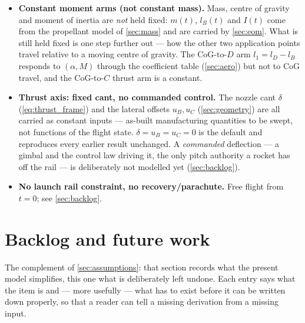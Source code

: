\documentclass[10pt]{extarticle}
\numberwithin{equation}{subsection}
\begin{document}
\begin{itemize}
    rotating $\hat{z}_g$; the two corrections stay deliberately independent
    (\autoref{sec:noninertial}, closing caveat).
    \item \textbf{Constant moment arms (not constant mass).} Mass, centre of gravity and moment of
    inertia are \emph{not} held fixed: $m(t)$, $l_B(t)$ and $I(t)$ come from the propellant model
    of \autoref{sec:mass} and are carried by \autoref{sec:eom}. What is still held fixed is one
    step further out --- how the other two application points travel relative to a moving centre
    of gravity. The CoG-to-$D$ arm $l_1=l_D-l_B$ responds to $(\alpha,M)$ through the coefficient
    table (\autoref{sec:aero}) but not to CoG travel, and the CoG-to-$C$ thrust arm is a constant.
    \item \textbf{Thrust axis: fixed cant, no commanded control.} The nozzle cant $\delta$
    (\autoref{eq:thrust_frame}) and the lateral offsets $u_B,u_C$ (\autoref{sec:geometry}) are all
    carried as constant inputs --- as-built manufacturing quantities to be swept, not functions of
    the flight state. $\delta=u_B=u_C=0$ is the default and reproduces every earlier result
    unchanged. A \emph{commanded} deflection --- a gimbal and the control law driving it, the
    only pitch authority a rocket has off the rail --- is deliberately not modelled yet
    (\autoref{sec:backlog}).
    \item \textbf{No launch rail constraint, no recovery/parachute.} Free flight from $t=0$; see
    \autoref{sec:backlog}.
\end{itemize}

\newpage


\newpage


\newpage


\newpage
\section{Backlog and future work}\label{sec:backlog}
The complement of \autoref{sec:assumptions}: that section records what the present model
simplifies, this one what is deliberately left undone. Each entry says what the item is and ---
more usefully --- what has to exist before it can be written down properly, so that a reader can
tell a missing derivation from a missing input.
\end{document}

